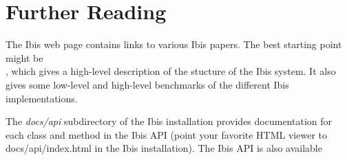 \documentclass[10pt]{article}
\newcommand{\mysection}[1]{\section{#1}\label{#1}}
\begin{document}
\mysection{Further Reading}

The Ibis web page
{}
{}
contains links to various Ibis papers.
The best starting point might be \\
{}
{}, which gives a high-level description of the stucture of the Ibis system.
It also gives some low-level and high-level benchmarks of the different Ibis implementations.

The \emph{docs/api} subdirectory of the Ibis installation provides
documentation for each class and method in the Ibis API (point your favorite
HTML viewer to docs/api/index.html in the Ibis installation).
The Ibis API is also available
\end{document}
